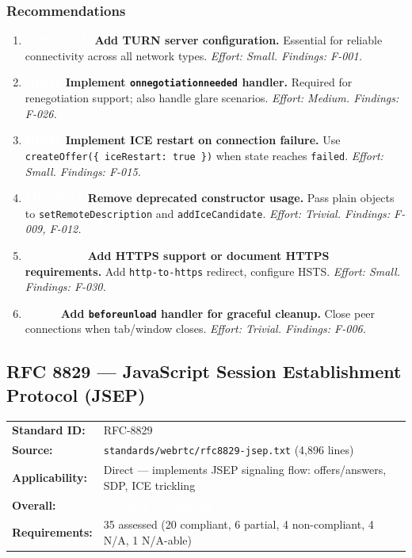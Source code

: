\documentclass[11pt,letterpaper]{article}
\newcommand{\mostlycompliant}{\colorbox{partial}{\textcolor{white}{\textbf{\small~Mostly Compliant~}}}}
\newcommand{\pricritical}{\colorbox{critical}{\textcolor{white}{\small\textbf{CRITICAL}}}}
\newcommand{\prihigh}{\colorbox{major}{\textcolor{white}{\small\textbf{HIGH}}}}
\newcommand{\primedium}{\colorbox{minor!80!black}{\textcolor{white}{\small\textbf{MEDIUM}}}}
\newcommand{\prilow}{\colorbox{notapplicable}{\textcolor{white}{\small\textbf{LOW}}}}
\begin{document}
\subsubsection{Recommendations}

\begin{enumerate}[leftmargin=2em]
    \item \pricritical\ \textbf{Add TURN server configuration.} Essential for reliable connectivity across all network types. \textit{Effort: Small. Findings: F-001.}
    \item \prihigh\ \textbf{Implement \texttt{onnegotiationneeded} handler.} Required for renegotiation support; also handle glare scenarios. \textit{Effort: Medium. Findings: F-026.}
    \item \prihigh\ \textbf{Implement ICE restart on connection failure.} Use \texttt{createOffer(\{ iceRestart: true \})} when state reaches \texttt{failed}. \textit{Effort: Small. Findings: F-015.}
    \item \primedium\ \textbf{Remove deprecated constructor usage.} Pass plain objects to \texttt{setRemoteDescription} and \texttt{addIceCandidate}. \textit{Effort: Trivial. Findings: F-009, F-012.}
    \item \primedium\ \textbf{Add HTTPS support or document HTTPS requirements.} Add \texttt{http-to-https} redirect, configure HSTS. \textit{Effort: Small. Findings: F-030.}
    \item \prilow\ \textbf{Add \texttt{beforeunload} handler for graceful cleanup.} Close peer connections when tab/window closes. \textit{Effort: Trivial. Findings: F-006.}
\end{enumerate}

\newpage

\subsection{RFC 8829 --- JavaScript Session Establishment Protocol (JSEP)}

\begin{tabular}{ll}
\textbf{Standard ID:} & RFC-8829 \\
\textbf{Source:} & \texttt{standards/webrtc/rfc8829-jsep.txt} (4,896 lines) \\
\textbf{Applicability:} & Direct --- implements JSEP signaling flow: offers/answers, SDP, ICE trickling \\
\textbf{Overall:} & \mostlycompliant \\
\textbf{Requirements:} & 35 assessed (20 compliant, 6 partial, 4 non-compliant, 4 N/A, 1 N/A-able) \\
\end{tabular}
\end{document}
